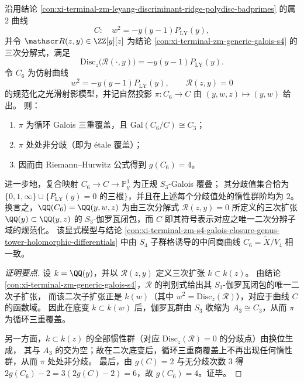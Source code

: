 \begin{conclusion}\label{con:xi-terminal-zm-discriminant-ridge-etale-c3-explicit-model}
沿用结论 \ref{con:xi-terminal-zm-leyang-discriminant-ridge-polydisc-badprimes} 的属 \(2\) 曲线
\[
C:\quad w^{2}=-y(y-1)P_{\mathrm{LY}}(y),
\]
并令 \(\mathscr R(z,y)\in\ZZ[y][z]\) 为结论 \ref{con:xi-terminal-zm-generic-galois-s4} 的三次分解式，满足
\[
\mathrm{Disc}_{z}\bigl(\mathscr R(\cdot,y)\bigr)=-y(y-1)P_{\mathrm{LY}}(y).
\]
令 \(C_{6}\) 为仿射曲线
\[
w^{2}=-y(y-1)P_{\mathrm{LY}}(y),\qquad \mathscr R(z,y)=0
\]
的规范化之光滑射影模型，并记自然投影 \(\pi:C_{6}\to C\) 由 \((y,w,z)\mapsto(y,w)\) 给出。
则：
\begin{enumerate}
  \item \(\pi\) 为循环 Galois 三重覆盖，且 \(\mathrm{Gal}(C_{6}/C)\cong C_{3}\)；
  \item \(\pi\) 处处非分歧（即为 \'etale 覆盖）；
  \item 因而由 Riemann--Hurwitz 公式得到 \(g(C_{6})=4\)。
\end{enumerate}
进一步地，复合映射 \(C_{6}\to C\to\mathbb P^1_y\) 为正规 \(S_3\)-Galois 覆叠；
其分歧值集合恰为 \(\{0,1,\infty\}\cup\{P_{\mathrm{LY}}(y)=0\text{ 的三根}\}\)，并且在上述每个分歧值处的惰性群阶均为 \(2\)。
换言之，\(\QQ(C_{6})=\QQ(y,w,z)\) 为由三次分解式 \(\mathscr R(z,y)=0\) 所定义的三次扩张 \(\QQ(y)\subset\QQ(y,z)\) 的 \(S_3\)-伽罗瓦闭包，而 \(C\) 即其符号表示对应之唯一二次分辨子域的规范化。
该显式模型与结论 \ref{con:xi-terminal-zm-s4-galois-closure-genus-tower-holomorphic-differentials} 中由 \(S_4\) 子群格诱导的中间商曲线 \(C_6=\widetilde X/V_4\) 相一致。
\end{conclusion}
\begin{proof}[证明要点]
设 \(k=\QQ(y)\)，并以 \(\mathscr R(z,y)\) 定义三次扩张 \(k\subset k(z)\)。
由结论 \ref{con:xi-terminal-zm-generic-galois-s4}，\(\mathscr R\) 的判别式给出其 \(S_3\)-伽罗瓦闭包的唯一二次子扩张，
而该二次子扩张正是 \(k(w)\)（其中 \(w^2=\mathrm{Disc}_z(\mathscr R)\)），对应于曲线 \(C\) 的函数域。
因此在底变 \(k\subset k(w)\) 后，伽罗瓦群由 \(S_3\) 收缩为 \(A_3\cong C_3\)，从而 \(\pi\) 为循环三重覆盖。
\par
另一方面，\(k\subset k(z)\) 的全部惯性群（对应 \(\mathrm{Disc}_z(\mathscr R)=0\) 的分歧点）由换位生成，
其与 \(A_3\) 的交为空；故在二次底变后，循环三重商覆盖上不再出现任何惰性群，从而 \(\pi\) 处处非分歧。
最后，由 \(g(C)=2\) 与无分歧次数 \(3\) 得
\(
2g(C_{6})-2=3(2g(C)-2)=6
\)，故 \(g(C_{6})=4\)。证毕。
\end{proof}

